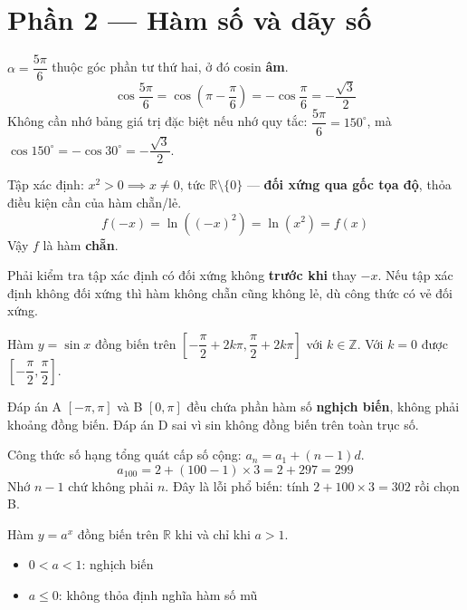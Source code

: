 \documentclass[11pt, a4paper]{article}
\begin{document}
\section{Phần 2 — Hàm số và dãy số}

\begin{dapan}[3 — Đáp án D]
$\alpha=\dfrac{5\pi}{6}$ thuộc góc phần tư thứ hai, ở đó cosin \textbf{âm}.
\[
\cos\frac{5\pi}{6}=\cos\left(\pi-\frac{\pi}{6}\right)=-\cos\frac{\pi}{6}=-\frac{\sqrt{3}}{2}
\]
 Không cần nhớ bảng giá trị đặc biệt nếu nhớ quy tắc: $\dfrac{5\pi}{6}=150^\circ$, mà $\cos 150^\circ=-\cos 30^\circ=-\dfrac{\sqrt{3}}{2}$.
\end{dapan}

\begin{dapan}[4 — Đáp án D]
Tập xác định: $x^2>0 \implies x \neq 0$, tức $\mathbb{R}\setminus\{0\}$ — \textbf{đối xứng qua gốc tọa độ}, thỏa điều kiện cần của hàm chẵn/lẻ.
\[
f(-x)=\ln\left((-x)^2\right)=\ln(x^2)=f(x)
\]
Vậy $f$ là hàm \textbf{chẵn}.

 Phải kiểm tra tập xác định có đối xứng không \textbf{trước khi} thay $-x$. Nếu tập xác định không đối xứng thì hàm không chẵn cũng không lẻ, dù công thức có vẻ đối xứng.
\end{dapan}

\begin{dapan}[5 — Đáp án C]
Hàm $y=\sin x$ đồng biến trên $\left[-\dfrac{\pi}{2}+2k\pi, \dfrac{\pi}{2}+2k\pi\right]$ với $k \in \mathbb{Z}$. Với $k=0$ được $\left[-\dfrac{\pi}{2},\dfrac{\pi}{2}\right]$.

 Đáp án A $[-\pi,\pi]$ và B $[0,\pi]$ đều chứa phần hàm số \textbf{nghịch biến}, không phải khoảng đồng biến. Đáp án D sai vì sin không đồng biến trên toàn trục số.
\end{dapan}

\begin{dapan}[6 — Đáp án D]
Công thức số hạng tổng quát cấp số cộng: $a_n=a_1+(n-1)d$.
\[
a_{100}=2+(100-1)\times 3=2+297=299
\]
 Nhớ $n-1$ chứ không phải $n$. Đây là lỗi phổ biến: tính $2+100\times3=302$ rồi chọn B.
\end{dapan}

\begin{dapan}[7 — Đáp án A]
Hàm $y=a^x$ đồng biến trên $\mathbb{R}$ khi và chỉ khi $a>1$.

\begin{itemize}[leftmargin=1.4em, itemsep=2pt]
\item $0<a<1$: nghịch biến
\item $a \le 0$: không thỏa định nghĩa hàm số mũ
\end{itemize}
\end{dapan}
\end{document}
